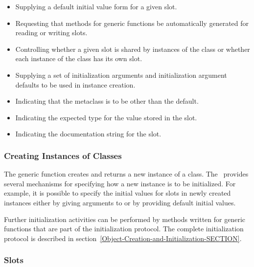 \begin{itemize}

\item  Supplying a default initial value form for a given slot.  

\item  Requesting that methods for generic functions
be automatically generated for reading or writing slots. 

\item  Controlling whether a given slot is shared by instances
of the class or whether each instance of the class has its own slot.

\item  Supplying a set of initialization arguments and initialization
argument defaults to be used in instance creation.


\item  Indicating that the metaclass is to be other than the default.

\item  Indicating the expected type for the value stored in the slot.

\item  Indicating the documentation string for the slot.

\end{itemize} 

\subsubsection{Creating Instances of Classes}

The generic function  creates and returns a new
instance of a class.  The \OS\ provides several mechanisms for
specifying how a new instance is to be initialized.  For example, it
is possible to specify the initial values for slots in newly created
instances either by giving arguments to  or by
providing default initial values.

Further initialization activities
can be performed by methods written for generic functions that are
part of the initialization protocol.  The complete initialization
protocol is described in section~\ref{Object-Creation-and-Initialization-SECTION}.

\subsubsection{Slots}

